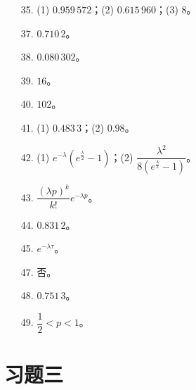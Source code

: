 \documentclass[../main.tex]{subfiles}
\begin{document}
\begin{enumerate}
\item[35.] (1) $0.959\,572$；(2) $0.615\,960$；(3) $8$。
\item[37.] $0.710\,2$。
\item[38.] $0.080\,302$。
\item[39.] $16$。
\item[40.] $102$。
\item[41.] (1) $0.483\,3$；(2) $0.98$。
\item[42.] (1) $e^{-\lambda}\left(e^{\frac{\lambda}{2}}-1\right)$；(2) $\dfrac{\lambda^{2}}{8\left(e^{\frac{\lambda}{2}}-1\right)}$。
\item[43.] $\dfrac{(\lambda p)^{k}}{k!}e^{-\lambda p}$。
\item[44.] $0.831\,2$。
\item[45.] $e^{-\lambda\tau}$。
\item[47.] 否。
\item[48.] $0.751\,3$。
\item[49.] $\dfrac{1}{2}<p<1$。
\end{enumerate}

\section*{习题三}
\end{document}
